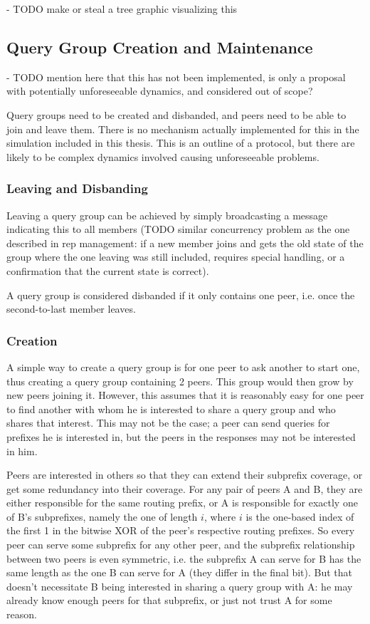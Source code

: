 - TODO make or steal a tree graphic visualizing this

\subsection{Query Group Creation and Maintenance}
- TODO mention here that this has not been implemented, is only a proposal with
  potentially unforeseeable dynamics, and considered out of scope?

Query groups need to be created and disbanded, and peers need to be able to join
and leave them. There is no mechanism actually implemented for this in the
simulation included in this thesis. This is an outline of a protocol, but there
are likely to be complex dynamics involved causing unforeseeable problems.

\subsubsection{Leaving and Disbanding}
Leaving a query group can be achieved by simply broadcasting a message
indicating this to all members (TODO similar concurrency problem as the one
described in rep management: if a new member joins and gets the old state of the
group where the one leaving was still included, requires special handling, or a
confirmation that the current state is correct).

A query group is considered disbanded if it only contains one peer, i.e. once
the second-to-last member leaves.

\subsubsection{Creation}
A simple way to create a query group is for one peer to ask another to start
one, thus creating a query group containing 2 peers. This group would then grow
by new peers joining it. However, this assumes that it is reasonably easy for
one peer to find another with whom he is interested to share a query group and
who shares that interest. This may not be the case; a peer can send queries for
prefixes he is interested in, but the peers in the responses may not be
interested in him.

Peers are interested in others so that they can extend their subprefix coverage,
or get some redundancy into their coverage. For any pair of peers A and B, they
are either responsible for the same routing prefix, or A is responsible for
exactly one of B's subprefixes, namely the one of length $i$, where $i$ is the
one-based index of the first 1 in the bitwise XOR of the peer's respective
routing prefixes. So every peer can serve some subprefix for any other peer, and
the subprefix relationship between two peers is even symmetric, i.e. the
subprefix A can serve for B has the same length as the one B can serve for A
(they differ in the final bit). But that doesn't necessitate B being interested
in sharing a query group with A: he may already know enough peers for that
subprefix, or just not trust A for some reason.

